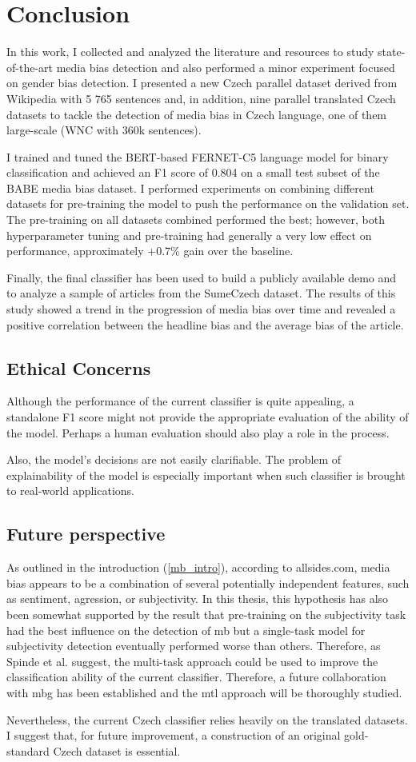 \chapter{Conclusion}
In this work, I collected and analyzed the literature and resources to study state-of-the-art media bias detection and also performed a minor experiment focused on gender bias detection. I presented a new Czech parallel dataset derived from Wikipedia with 5 765 sentences and, in addition, nine parallel translated Czech datasets to tackle the detection of media bias in Czech language, one of them large-scale (WNC with 360k sentences).

I trained and tuned the BERT-based FERNET-C5 language model for binary classification and achieved an F1 score of 0.804 on a small test subset of the BABE media bias dataset. I performed experiments on combining different datasets for pre-training the model to push the performance on the validation set. The pre-training on all datasets combined performed the best; however, both hyperparameter tuning and pre-training had generally a very low effect on performance, approximately +0.7\% gain over the baseline. 

Finally, the final classifier has been used to build a publicly available demo and to analyze a sample of articles from the SumeCzech dataset. The results of this study showed a trend in the progression of media bias over time and revealed a positive correlation between the headline bias and the average bias of the article.

\section{Ethical Concerns}
Although the performance of the current classifier is quite appealing, a standalone F1 score might not provide the appropriate evaluation of the ability of the model. Perhaps a human evaluation should also play a role in the process.

Also, the model's decisions are not easily clarifiable. The problem of explainability of the model is especially important when such classifier is brought to real-world applications. 


\section{Future perspective}
As outlined in the introduction (\ref{mb_intro}), according to allsides.com, media bias appears to be a combination of several potentially independent features, such as sentiment, agression, or subjectivity. In this thesis, this hypothesis has also been somewhat supported by the result that pre-training on the subjectivity task had the best influence on the detection of \gls{mb} but a single-task model for subjectivity detection eventually performed worse than others. Therefore, as Spinde et al. \cite{spindeexploiting} suggest, the multi-task approach could be used to improve the classification ability of the current classifier. Therefore, a future collaboration with \gls{mbg} has been established and the \gls{mtl} approach will be thoroughly studied.


Nevertheless, the current Czech classifier relies heavily on the translated datasets. I suggest that, for future improvement, a construction of an original gold-standard Czech dataset is essential.
